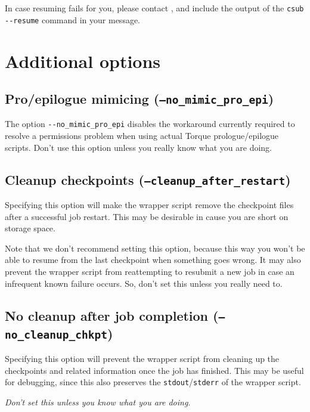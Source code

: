 In case resuming fails for you, please contact \hpcinfo, and include the output
of the \lstinline|csub --resume| command in your message.

\section{Additional options}

\subsection{Pro/epilogue mimicing (\texttt{--no\_mimic\_pro\_epi})}

The option \lstinline|--no_mimic_pro_epi| disables the workaround currently required to resolve
a permissions problem when using actual Torque prologue/epilogue scripts. Don't use
this option unless you really know what you are doing.

\subsection{Cleanup checkpoints (\texttt{--cleanup\_after\_restart})}

Specifying this option will make the wrapper script remove the checkpoint files after
a successful job restart. This may be desirable in cause you are short on storage space.

Note that we don't recommend setting this option, because this way you won't be able
to resume from the last checkpoint when something goes wrong. It may also prevent
the wrapper script from reattempting to resubmit a new job in case an infrequent known
failure occurs. So, don't set this unless you really need to.

\subsection{No cleanup after job completion (\texttt{--no\_cleanup\_chkpt})}

Specifying this option will prevent the wrapper script from cleaning up the
checkpoints and related information once the job has finished. This may be useful
for debugging, since this also preserves the \lstinline|stdout|/\lstinline|stderr|
of the wrapper script.

\emph{Don't set this unless you know what you are doing}.
